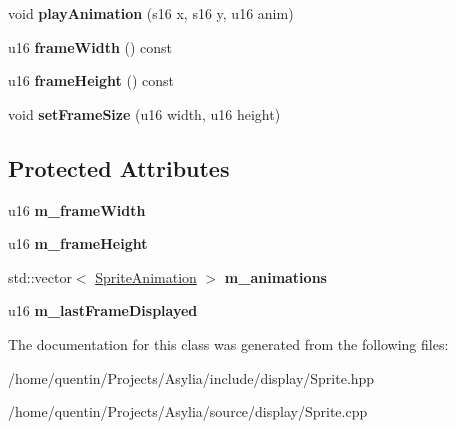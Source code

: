 \begin{DoxyCompactItemize}
\item 
\hypertarget{classSprite_a62702abb213905c67227df6ae7ede67b}{void {\bfseries play\-Animation} (s16 x, s16 y, u16 anim)}\label{classSprite_a62702abb213905c67227df6ae7ede67b}

\item 
\hypertarget{classSprite_a354b36eaa7df52728457faf1ccba9d47}{u16 {\bfseries frame\-Width} () const }\label{classSprite_a354b36eaa7df52728457faf1ccba9d47}

\item 
\hypertarget{classSprite_a42620eb04fe4f3e71e351533d5ce9d8b}{u16 {\bfseries frame\-Height} () const }\label{classSprite_a42620eb04fe4f3e71e351533d5ce9d8b}

\item 
\hypertarget{classSprite_a9b414f0f27aa5d62d47fa20c64d800ba}{void {\bfseries set\-Frame\-Size} (u16 width, u16 height)}\label{classSprite_a9b414f0f27aa5d62d47fa20c64d800ba}

\end{DoxyCompactItemize}
\subsection*{Protected Attributes}
\begin{DoxyCompactItemize}
\item 
\hypertarget{classSprite_a165ccf2534677f506b4ae2ea38e988f7}{u16 {\bfseries m\-\_\-frame\-Width}}\label{classSprite_a165ccf2534677f506b4ae2ea38e988f7}

\item 
\hypertarget{classSprite_a9cf36cbf32399c7781bf0bf06d16a7b7}{u16 {\bfseries m\-\_\-frame\-Height}}\label{classSprite_a9cf36cbf32399c7781bf0bf06d16a7b7}

\item 
\hypertarget{classSprite_afed43cbdbec4fbdd8138844384e788ef}{std\-::vector$<$ \hyperlink{structSpriteAnimation}{Sprite\-Animation} $>$ {\bfseries m\-\_\-animations}}\label{classSprite_afed43cbdbec4fbdd8138844384e788ef}

\item 
\hypertarget{classSprite_af082aaf1f64e00cddeed776ff6621fff}{u16 {\bfseries m\-\_\-last\-Frame\-Displayed}}\label{classSprite_af082aaf1f64e00cddeed776ff6621fff}

\end{DoxyCompactItemize}


The documentation for this class was generated from the following files\-:\begin{DoxyCompactItemize}
\item 
/home/quentin/\-Projects/\-Asylia/include/display/Sprite.\-hpp\item 
/home/quentin/\-Projects/\-Asylia/source/display/Sprite.\-cpp\end{DoxyCompactItemize}
